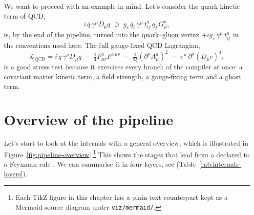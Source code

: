We want to proceed with an example in mind. Let's consider the quark kinetic term of QCD,
\begin{equation}
    i\,\bar q\,\gamma^\mu D_\mu q \;\supset\; g_s\,\bar q_{i}\,\gamma^\mu\,t^a_{ij}\,q_{j}\,G^a_\mu ,
    \label{eq:qcd-current}
\end{equation}
is, by the end of the pipeline, turned into the quark--gluon vertex $+i g_s\,\gamma^\mu\,t^a_{ij}$ in the conventions used here. The full gauge-fixed QCD Lagrangian,
\begin{equation}
\mathcal{L}_{\mathrm{QCD}}
= i\,\bar q\,\gamma^\mu D_\mu q
\;-\;\tfrac14 F^a_{\mu\nu} F^{a\,\mu\nu}
\;-\;\tfrac{1}{2\xi}\!\left(\partial^\mu A^a_\mu\right)^2
\;-\;\bar c^{\,a}\,\partial^\mu (D_\mu c)^a ,
\label{eq:qcd-full}
\end{equation}
is a good stress test because it exercises every branch of the compiler at once: a covariant matter kinetic term, a field strength, a gauge-fixing term and a ghost term.

\section{Overview of the pipeline}
\label{sec:internals-overview}

Let's start to look at the internals with a general overview, which is illustrated in
Figure~\ref{fig:pipeline-overview}.\footnote{Each TikZ figure in this chapter has a plain-text counterpart kept as a Mermaid source diagram under \texttt{viz/mermaid/}.} This shows the stages that lead from a declared  to a Feynman-rule . We can summarise it in four layers, see (Table~\ref{tab:internals-layers}).

